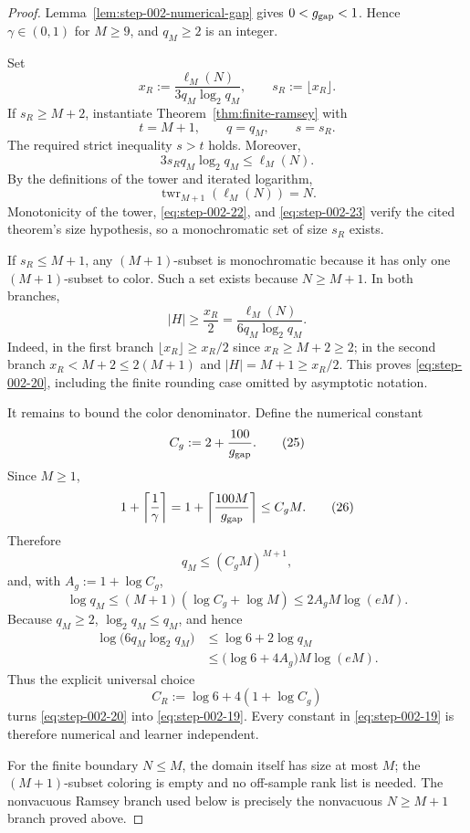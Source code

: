 \begin{proof}

Lemma~\ref{lem:step-002-numerical-gap} gives \(0<g_{\rm gap}<1\). Hence \(\gamma \in (0,1)\) for \(M\ge 9\), and \(q_M\ge 2\) is an integer.

Set
\[
x_R:=\frac{\ell_M(N)}{3q_M\log_2 q_M},
\qquad
s_R:=\lfloor x_R\rfloor.
\tag{21}\label{eq:step-002-21}
\]
If \(s_R\ge M+2\), instantiate Theorem~\ref{thm:finite-ramsey} with
\[
t=M+1,\qquad q=q_M,\qquad s=s_R.
\]
The required strict inequality \(s>t\) holds. Moreover,
\[
3s_Rq_M\log_2q_M\le\ell_M(N).
\tag{22}\label{eq:step-002-22}
\]
By the definitions of the tower and iterated logarithm,
\[
\operatorname{twr}_{M+1}(\ell_M(N))=N.
\tag{23}\label{eq:step-002-23}
\]
Monotonicity of the tower, \eqref{eq:step-002-22}, and \eqref{eq:step-002-23} verify the cited theorem's size hypothesis, so a monochromatic set of size \(s_R\) exists.

If \(s_R\le M+1\), any \((M+1)\)-subset is monochromatic because it has only one \((M+1)\)-subset to color. Such a set exists because \(N\ge M+1\). In both branches,
\[
|H|\ge\frac{x_R}{2}
=\frac{\ell_M(N)}{6q_M\log_2q_M}.
\tag{24}\label{eq:step-002-24}
\]
Indeed, in the first branch \(\lfloor x_R\rfloor\ge x_R/2\) since \(x_R\ge M+2\ge 2\); in the second branch \(x_R<M+2\le 2(M+1)\) and \(|H|=M+1\ge x_R/2\). This proves \eqref{eq:step-002-20}, including the finite rounding case omitted by asymptotic notation.

It remains to bound the color denominator. Define the numerical constant
\[
C_g:=2+\frac{100}{g_{\rm gap}}.
\tag{25}\label{eq:step-002-25}
\]
Since \(M\ge 1\),
\[
1+\left\lceil\frac1\gamma\right\rceil
=1+\left\lceil\frac{100M}{g_{\rm gap}}\right\rceil
\le C_gM.
\tag{26}\label{eq:step-002-26}
\]
Therefore
\[
q_M\le(C_gM)^{M+1},
\tag{27}\label{eq:step-002-27}
\]
and, with \(A_g:=1+\log C_g\),
\[
\log q_M
\le(M+1)(\log C_g+\log M)
\le2A_gM\log(eM).
\tag{28}\label{eq:step-002-28}
\]
Because \(q_M\ge 2\), \(\log_2q_M\le q_M\), and hence
\[
\begin{aligned}
\log\bigl(6q_M\log_2q_M\bigr)
&\le\log6+2\log q_M\\
&\le\bigl(\log6+4A_g\bigr)M\log(eM).
\end{aligned}
\tag{29}\label{eq:step-002-29}
\]
Thus the explicit universal choice
\[
C_R:=\log6+4(1+\log C_g)
\tag{30}\label{eq:step-002-30}
\]
turns \eqref{eq:step-002-20} into \eqref{eq:step-002-19}. Every constant in \eqref{eq:step-002-19} is therefore numerical and learner independent.

For the finite boundary \(N\le M\), the domain itself has size at most \(M\); the \((M+1)\)-subset coloring is empty and no off-sample rank list is needed. The nonvacuous Ramsey branch used below is precisely the nonvacuous \(N\ge M+1\) branch proved above.

\end{proof}


